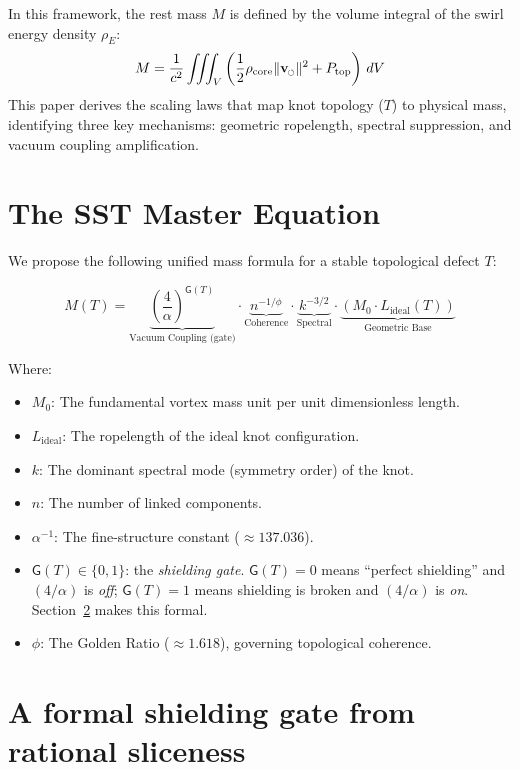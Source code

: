 \documentclass[11pt, a4paper]{article}
\newcommand{\swirlarrow}{%
  \mathchoice{\mkern-2mu\scriptstyle\boldsymbol{\circlearrowleft}}%
             {\mkern-2mu\scriptstyle\boldsymbol{\circlearrowleft}}%
             {\mkern-2mu\scriptscriptstyle\boldsymbol{\circlearrowleft}}%
             {\mkern-2mu\scriptscriptstyle\boldsymbol{\circlearrowleft}}%
}
\newcommand{\vswirl}{\mathbf{v}_{\swirlarrow}}
\newcommand{\vnorm}{\lVert \vswirl \rVert}
\begin{document}
In this framework, the rest mass $M$ is defined by the volume integral of the swirl energy density $\rho_E$:
\begin{equation}
    M = \frac{1}{c^2} \iiint_V \left( \frac{1}{2}\rho_{\text{core}} \vnorm^2 + P_{\text{top}} \right)\, dV
\end{equation}
This paper derives the scaling laws that map knot topology ($T$) to physical mass, identifying three key mechanisms: geometric ropelength, spectral suppression, and vacuum coupling amplification.

\section{The SST Master Equation}
We propose the following unified mass formula for a stable topological defect $T$:

\begin{equation}
    M(T) =
    \underbrace{\left( \frac{4}{\alpha} \right)^{\mathsf{G}(T)}}_{\text{Vacuum Coupling (gate)}}
    \cdot \underbrace{n^{-1/\phi}}_{\text{Coherence}}
    \cdot \underbrace{k^{-3/2}}_{\text{Spectral}}
    \cdot \underbrace{\left( M_0 \cdot L_{\text{ideal}}(T) \right)}_{\text{Geometric Base}}
\end{equation}

Where:
\begin{itemize}
    \item $M_0$: The fundamental vortex mass unit per unit dimensionless length.
    \item $L_{\text{ideal}}$: The ropelength of the ideal knot configuration.
    \item $k$: The dominant spectral mode (symmetry order) of the knot.
    \item $n$: The number of linked components.
    \item $\alpha^{-1}$: The fine-structure constant ($\approx 137.036$).
    \item $\mathsf{G}(T)\in\{0,1\}$: the \emph{shielding gate}.  \(\mathsf{G}(T)=0\) means ``perfect shielding'' and \((4/\alpha)\) is \emph{off};
    \(\mathsf{G}(T)=1\) means shielding is broken and \((4/\alpha)\) is \emph{on}.  Section~\ref{sec:gate} makes this formal.
    \item $\phi$: The Golden Ratio ($\approx 1.618$), governing topological coherence.
\end{itemize}

\section{A formal shielding gate from rational sliceness}\label{sec:gate}
\end{document}
